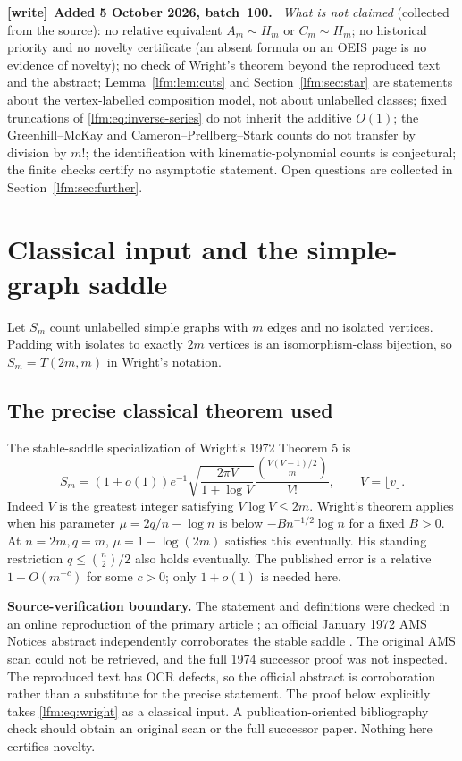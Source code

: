\documentclass[11pt,letterpaper]{article}
\theoremstyle{remark}\newtheorem{remark}[theorem]{Remark}
\newenvironment{writenote}[1][]{\par\smallskip\begingroup\small
 \noindent\textbf{[write]}\if\relax\detokenize{#1}\relax\else~\textbf{#1.}\fi\ }%
 {\par\endgroup\smallskip}
\begin{document}
\begin{writenote}[Added 5 October 2026, batch~100]
\emph{What is not claimed} (collected from the source): no relative equivalent
$A_m\sim H_m$ or $C_m\sim H_m$; no historical priority and no novelty
certificate (an absent formula on an OEIS page is no evidence of novelty);
no check of Wright's theorem beyond the reproduced text and the abstract;
Lemma~\ref{lfm:lem:cuts} and Section~\ref{lfm:sec:star} are statements about
the vertex-labelled composition model, not about unlabelled classes; fixed
truncations of \eqref{lfm:eq:inverse-series} do not inherit the additive
$O(1)$; the Greenhill--McKay and Cameron--Prellberg--Stark counts do not
transfer by division by $m!$; the identification with kinematic-polynomial
counts is conjectural; the finite checks certify no asymptotic statement.
Open questions are collected in Section~\ref{lfm:sec:further}.
\end{writenote}

\section{Classical input and the simple-graph saddle}\label{lfm:sec:wright}
Let $S_m$ count unlabelled simple graphs with $m$ edges and no isolated vertices. Padding with isolates to exactly $2m$ vertices is an isomorphism-class bijection, so $S_m=T(2m,m)$ in Wright's notation.

\subsection{The precise classical theorem used}
The stable-saddle specialization of Wright's 1972 Theorem 5 \cite{wright72} is
\begin{equation}
 S_m=(1+o(1))e^{-1}\sqrt{\frac{2\pi V}{1+\log V}}
       \frac{\binom{V(V-1)/2}{m}}{V!},
 \qquad V=\lfloor v\rfloor.\label{lfm:eq:wright}
\end{equation}
Indeed $V$ is the greatest integer satisfying $V\log V\le2m$. Wright's theorem applies when his parameter $\mu=2q/n-\log n$ is below $-B n^{-1/2}\log n$ for a fixed $B>0$. At $n=2m,q=m$, $\mu=1-\log(2m)$ satisfies this eventually. His standing restriction $q\le\binom n2/2$ also holds eventually. The published error is a relative $1+O(m^{-c})$ for some $c>0$; only $1+o(1)$ is needed here.

\textbf{Source-verification boundary.} The statement and definitions were checked in an online reproduction of the primary article \cite{wrighttext}; an official January 1972 AMS Notices abstract independently corroborates the stable saddle \cite{wrightabstract}. The original AMS scan could not be retrieved, and the full 1974 successor proof \cite{wright74} was not inspected. The reproduced text has OCR defects, so the official abstract is corroboration rather than a substitute for the precise statement. The proof below explicitly takes \eqref{lfm:eq:wright} as a classical input. A publication-oriented bibliography check should obtain an original scan or the full successor paper. Nothing here certifies novelty.
\end{document}
